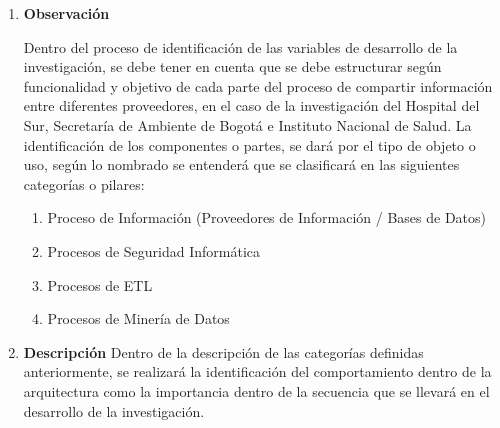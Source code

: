 \documentclass[a4paper, 11pt, oneside]{article}
\theoremstyle{definition}
\theoremstyle{remark}
\begin{document}
\begin{enumerate}[I]
\item\textbf{Observación}

Dentro del proceso de identificación de las variables de desarrollo de la investigación, se debe tener en cuenta que se debe estructurar según funcionalidad y objetivo de cada parte del  proceso de compartir información entre diferentes proveedores, en el caso de la investigación del Hospital del Sur, Secretaría de Ambiente de Bogotá e Instituto Nacional de Salud. La identificación de los componentes o partes, se dará por el tipo de objeto o uso, según lo nombrado se entenderá que se clasificará en las siguientes categorías o pilares:

\begin{enumerate}[1.]
\item{Proceso de Información (Proveedores de Información / Bases de Datos)}
\item{Procesos de Seguridad Informática}
\item{Procesos de ETL}
\item{Procesos de Minería de Datos}
\end{enumerate}

\item\textbf{Descripción}
Dentro de la descripción de las categorías definidas anteriormente, se realizará la identificación del comportamiento dentro de la arquitectura como la importancia dentro de la secuencia que se llevará en el desarrollo de la investigación.


\end{enumerate}
\end{document}
